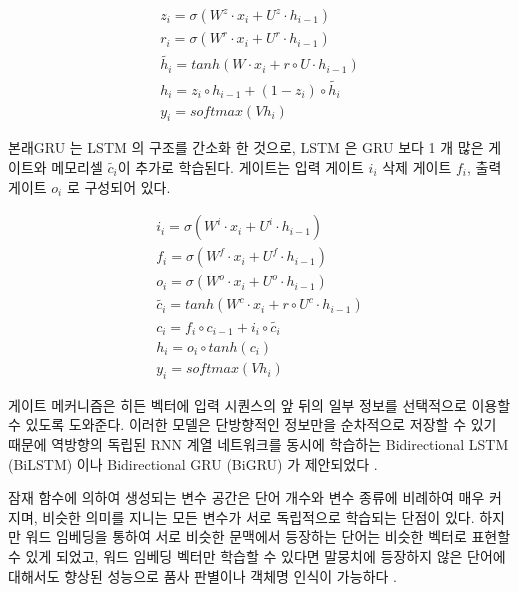 \documentclass[11pt]{article}
\begin{document}
\begin{equation}
  \label{eq:gru}
  \begin{aligned}
  z_i = \sigma(W^z \cdot x_i + U^z \cdot h_{i-1}) \\
  r_i = \sigma(W^r \cdot x_i + U^r \cdot h_{i-1}) \\
  \tilde{h_i} = tanh \left( W \cdot x_i + r \circ U \cdot h_{i-1}\right) \\
  h_i = z_i \circ h_{i-1} + (1 - z_i) \circ \tilde{h_i} \\
  y_i = softmax(Vh_i)
  \end{aligned}
\end{equation}

본래GRU 는 LSTM 의 구조를 간소화 한 것으로, LSTM 은 GRU 보다 1 개 많은 게이트와 메모리셀 $\tilde{c_i}$이 추가로 학습된다.
게이트는 입력 게이트 $i_i$ 삭제 게이트 $f_i$, 출력 게이트 $o_i$ 로 구성되어 있다.

\begin{equation}
  \label{eq:lstm}
  \begin{aligned}
  i_i = \sigma(W^i \cdot x_i + U^i \cdot h_{i-1}) \\
  f_i = \sigma(W^f \cdot x_i + U^f \cdot h_{i-1}) \\
  o_i = \sigma(W^o \cdot x_i + U^o \cdot h_{i-1}) \\
  \tilde{c_i} = tanh \left( W^c \cdot x_i + r \circ U^c \cdot h_{i-1}\right) \\
  c_i = f_i \circ c_{i-1} + i_i \circ \tilde{c_i} \\
  h_i = o_i \circ tanh (c_i) \\
  y_i = softmax(Vh_i)
  \end{aligned}
\end{equation}

게이트 메커니즘은 히든 벡터에 입력 시퀀스의 앞 뒤의 일부 정보를 선택적으로 이용할 수 있도록 도와준다.
이러한 모델은 단방향적인 정보만을 순차적으로 저장할 수 있기 때문에 역방향의 독립된 RNN 계열 네트워크를 동시에 학습하는 Bidirectional LSTM (BiLSTM) 이나 Bidirectional GRU (BiGRU) 가 제안되었다 \citep{graves2005bidirectional}.

잠재 함수에 의하여 생성되는 변수 공간은 단어 개수와 변수 종류에 비례하여 매우 커지며, 비슷한 의미를 지니는 모든 변수가 서로 독립적으로 학습되는 단점이 있다.
하지만 워드 임베딩을 통하여 서로 비슷한 문맥에서 등장하는 단어는 비슷한 벡터로 표현할 수 있게 되었고, 워드 임베딩 벡터만 학습할 수 있다면 말뭉치에 등장하지 않은 단어에 대해서도 향상된 성능으로 품사 판별이나 객체명 인식이 가능하다 \citep{collobert2011natural, lample2016neural}.
\end{document}

